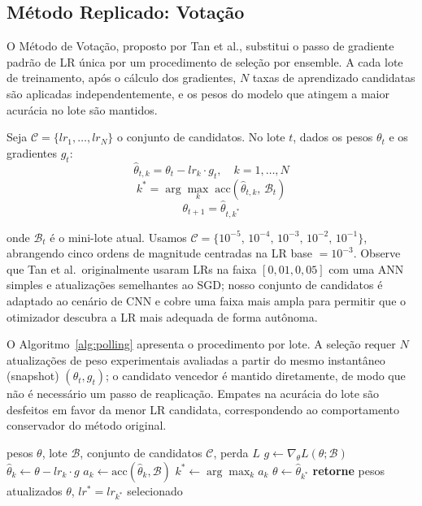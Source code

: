 \documentclass[conference]{IEEEtran}
\begin{document}
\subsection{Método Replicado: Votação}

O Método de Votação, proposto por Tan et al., substitui o passo de gradiente padrão de LR única por um procedimento de seleção por ensemble. A cada lote de treinamento, após o cálculo dos gradientes, $N$ taxas de aprendizado candidatas são aplicadas independentemente, e os pesos do modelo que atingem a maior acurácia no lote são mantidos.

Seja $\mathcal{C} = \{lr_1, \ldots, lr_N\}$ o conjunto de candidatos. No lote $t$, dados os pesos $\theta_t$ e os gradientes $g_t$:
\begin{equation}
\hat{\theta}_{t,k} = \theta_t - lr_k \cdot g_t, \quad k = 1,\ldots,N
\end{equation}
\begin{equation}
k^{*} = \arg\max_{k} \; \mathrm{acc}(\hat{\theta}_{t,k},\, \mathcal{B}_t)
\end{equation}
\begin{equation}
\theta_{t+1} = \hat{\theta}_{t,k^{*}}
\end{equation}

onde $\mathcal{B}_t$ é o mini-lote atual. Usamos $\mathcal{C} = \{10^{-5},\, 10^{-4},\, 10^{-3},\, 10^{-2},\, 10^{-1}\}$, abrangendo cinco ordens de magnitude centradas na LR base $= 10^{-3}$. Observe que Tan et al.\ originalmente usaram LRs na faixa $[0{,}01, 0{,}05]$ com uma ANN simples e atualizações semelhantes ao SGD; nosso conjunto de candidatos é adaptado ao cenário de CNN e cobre uma faixa mais ampla para permitir que o otimizador descubra a LR mais adequada de forma autônoma.

O Algoritmo~\ref{alg:polling} apresenta o procedimento por lote. A seleção requer $N$ atualizações de peso experimentais avaliadas a partir do mesmo instantâneo (snapshot) $(\theta_t, g_t)$; o candidato vencedor é mantido diretamente, de modo que não é necessário um passo de reaplicação. Empates na acurácia do lote são desfeitos em favor da menor LR candidata, correspondendo ao comportamento conservador do método original.

\begin{algorithm}[htbp]
\caption{Passo de Votação (método base, um lote)}
\label{alg:polling}
\begin{algorithmic}[1]
\REQUIRE pesos $\theta$, lote $\mathcal{B}$, conjunto de candidatos $\mathcal{C}$, perda $L$
\STATE $g \leftarrow \nabla_\theta L(\theta; \mathcal{B})$ 
    \STATE $\hat{\theta}_k \leftarrow \theta - lr_k \cdot g$ 
    \STATE $a_k \leftarrow \mathrm{acc}(\hat{\theta}_k, \mathcal{B})$
\ENDFOR
\STATE $k^{*} \leftarrow \arg\max_k a_k$ 
\STATE $\theta \leftarrow \hat{\theta}_{k^{*}}$
\STATE \textbf{retorne} pesos atualizados $\theta$, $lr^{*} = lr_{k^{*}}$ selecionado
\end{algorithmic}
\end{algorithm}
\end{document}
